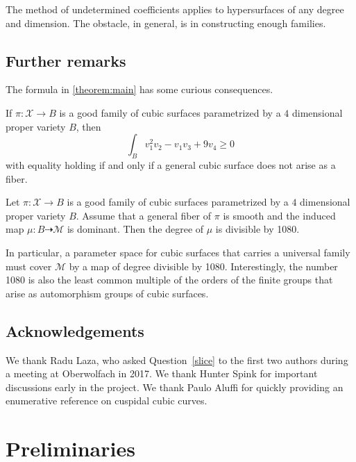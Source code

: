 \documentclass[12pt,reqno]{amsart}
\newcommand{\todo}[1]{\fbox{ToDo: #1}}
\renewcommand{\to}{{\longrightarrow}}
\numberwithin{equation}{section}
\newcommand{\cX}{\mathcal{X}}
\begin{document}
The method of undetermined coefficients applies to hypersurfaces of
any degree and dimension.  The obstacle, in general, is in constructing enough
families.

\subsection{Further remarks}
The formula in \autoref{theorem:main} has some curious consequences.
\begin{corollary}
  \label{cor:ineq} If $\pi \colon \cX \to B$ is a good family of cubic
  surfaces parametrized by a $4$ dimensional proper variety $B$,
  then $$\int_{B} v_{1}^{2}v_{2} - v_{1}v_3 + 9v_{4} \geq 0$$ with
  equality holding if and only if a general cubic surface does not
  arise as a fiber.
\end{corollary}

\begin{corollary}
  \label{cor:ineq} Let $\pi \colon \cX \to B$ is a good family of cubic
  surfaces parametrized by a $4$ dimensional proper variety $B$.
  Assume that a general fiber of $\pi$ is smooth and the induced map
  $\mu \colon B \dashrightarrow \mathcal M$ is dominant.
  Then the degree of $\mu$ is divisible by 1080.
\end{corollary}
In particular, a parameter space for cubic surfaces that carries a
universal family must cover $\mathcal M$ by a map of degree divisible
by 1080.
Interestingly, the number 1080 is also the least common multiple of the
orders of the finite groups that arise as automorphism groups of cubic surfaces.

\subsection{Acknowledgements}
We thank Radu Laza, who asked Question~\ref{slice} to the first two
authors during a meeting at Oberwolfach in 2017.  We thank Hunter
Spink for important discussions early in the project.  We thank Paulo
Aluffi for quickly providing an enumerative reference on cuspidal
cubic curves.  

\todo{More acknowledgements}

  




\section{Preliminaries}
\label{sec:good}
\end{document}
